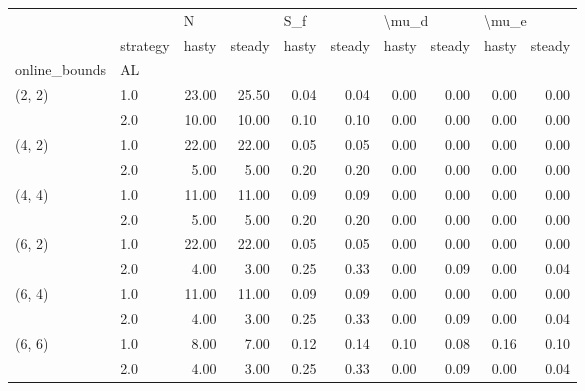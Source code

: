 \begin{tabular}{llrrrrrrrr}
\toprule
       & {} & \multicolumn{2}{l}{N} & \multicolumn{2}{l}{S\_f} & \multicolumn{2}{l}{\textbackslash mu\_d} & \multicolumn{2}{l}{\textbackslash mu\_e} \\
       & strategy & hasty & steady & hasty & steady & hasty & steady & hasty & steady \\
online\_bounds & AL &       &        &       &        &       &        &       &        \\
\midrule
(2, 2) & 1.0 & 23.00 &  25.50 &  0.04 &   0.04 &  0.00 &   0.00 &  0.00 &   0.00 \\
       & 2.0 & 10.00 &  10.00 &  0.10 &   0.10 &  0.00 &   0.00 &  0.00 &   0.00 \\
(4, 2) & 1.0 & 22.00 &  22.00 &  0.05 &   0.05 &  0.00 &   0.00 &  0.00 &   0.00 \\
       & 2.0 &  5.00 &   5.00 &  0.20 &   0.20 &  0.00 &   0.00 &  0.00 &   0.00 \\
(4, 4) & 1.0 & 11.00 &  11.00 &  0.09 &   0.09 &  0.00 &   0.00 &  0.00 &   0.00 \\
       & 2.0 &  5.00 &   5.00 &  0.20 &   0.20 &  0.00 &   0.00 &  0.00 &   0.00 \\
(6, 2) & 1.0 & 22.00 &  22.00 &  0.05 &   0.05 &  0.00 &   0.00 &  0.00 &   0.00 \\
       & 2.0 &  4.00 &   3.00 &  0.25 &   0.33 &  0.00 &   0.09 &  0.00 &   0.04 \\
(6, 4) & 1.0 & 11.00 &  11.00 &  0.09 &   0.09 &  0.00 &   0.00 &  0.00 &   0.00 \\
       & 2.0 &  4.00 &   3.00 &  0.25 &   0.33 &  0.00 &   0.09 &  0.00 &   0.04 \\
(6, 6) & 1.0 &  8.00 &   7.00 &  0.12 &   0.14 &  0.10 &   0.08 &  0.16 &   0.10 \\
       & 2.0 &  4.00 &   3.00 &  0.25 &   0.33 &  0.00 &   0.09 &  0.00 &   0.04 \\
\bottomrule
\end{tabular}
